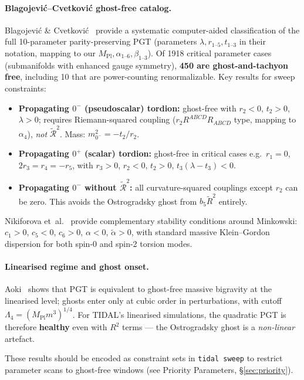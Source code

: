 \documentclass[12pt,a4paper]{article}
\newcommand{\Ric}{\tilde{\mathcal{R}}} %
\newcommand{\Mpl}{M_{\mathrm{Pl}}}  %
\begin{document}
\paragraph{Blagojevi\'{c}--Cvetkovi\'{c} ghost-free catalog.}
Blagojevi\'{c} \& Cvetkovi\'{c}~\cite{Blagojevic:2018dpz} provide a
systematic computer-aided classification of the full 10-parameter
parity-preserving PGT (parameters $\lambda, r_{1\text{--}5}, t_{1\text{--}3}$
in their notation, mapping to our $\Mpl, \alpha_{1\text{--}6}, \beta_{1\text{--}3}$).
Of 1918 critical parameter cases (submanifolds with enhanced gauge symmetry),
\textbf{450 are ghost-and-tachyon free}, including 10 that are power-counting
renormalizable. Key results for sweep constraints:
\begin{itemize}
  \item \textbf{Propagating $0^-$ (pseudoscalar) tordion:} ghost-free with
    $r_2 < 0$, $t_2 > 0$, $\lambda > 0$; requires Riemann-squared coupling
    ($r_2 R^{ABCD}R_{ABCD}$ type, mapping to $\alpha_4$), \emph{not} $\Ric^2$.
    Mass: $m_{0^-}^2 = -t_2/r_2$.
  \item \textbf{Propagating $0^+$ (scalar) tordion:} ghost-free in critical cases
    e.g.\ $r_1 = 0$, $2r_3 = r_4 = -r_5$, with $r_3 > 0$, $r_2 < 0$, $t_2 > 0$,
    $t_3(\lambda - t_3) < 0$.
  \item \textbf{Propagating $0^-$ without $\Ric^2$:} all curvature-squared
    couplings except $r_2$ can be zero. This avoids the Ostrogradsky ghost from
    $b_5 \widetilde{R}^2$ entirely.
\end{itemize}
Nikiforova et~al.~\cite{Nikiforova:2009qr} provide complementary stability
conditions around Minkowski: $c_1 > 0$, $c_5 < 0$, $c_6 > 0$, $\alpha < 0$,
$\tilde{\alpha} > 0$, with standard massive Klein--Gordon dispersion for both
spin-0 and spin-2 torsion modes.

\paragraph{Linearised regime and ghost onset.}
Aoki~\cite{Aoki:2019snr} shows that PGT is equivalent to ghost-free massive
bigravity at the linearised level; ghosts enter only at cubic order in perturbations,
with cutoff $\Lambda_4 = (M_{\text{Pl}} m^3)^{1/4}$. For TIDAL's linearised
simulations, the quadratic PGT is therefore \textbf{healthy} even with $R^2$ terms
--- the Ostrogradsky ghost is a \emph{non-linear} artefact.

These results should be encoded as constraint sets in \texttt{tidal sweep}
to restrict parameter scans to ghost-free windows (see Priority Parameters,
\S\ref{sec:priority}).
\end{document}
